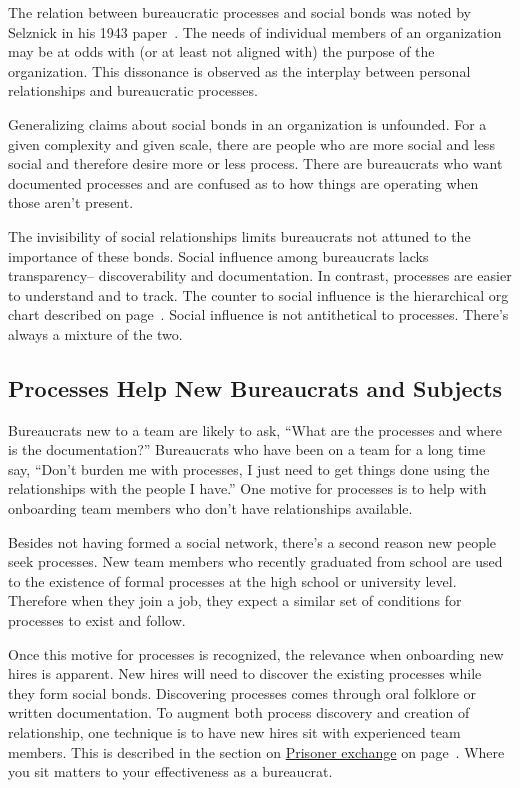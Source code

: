 The relation between bureaucratic processes and social bonds was noted by Selznick in his 1943 paper~\cite{1943_Selznick}. The needs of individual members of an organization may be at odds with (or at least not aligned with) the purpose of the organization. This dissonance is observed as the interplay between personal relationships and bureaucratic processes.

Generalizing claims about social bonds in an organization is unfounded. 
For a given complexity and given scale, there are people who are more social and less social and therefore desire more or less process.
There are bureaucrats who want documented processes and are confused as to how things are operating when those aren't present. 

The invisibility of social relationships limits bureaucrats not attuned to the importance of these bonds. 
Social influence among bureaucrats lacks transparency-- discoverability and documentation. 
In contrast, processes are easier to understand and to track. The counter to social influence is the hierarchical \gls{org chart} described on 
page~\pageref{sec:org-chart-as-guide-and-lie}.
Social influence is not antithetical to processes. There's always a mixture of the two.


\subsection*{Processes Help New Bureaucrats and Subjects}

Bureaucrats new to a team are likely to ask, ``What are the processes and where is the documentation?'' Bureaucrats who have been on a team for a long time say, ``Don't burden me with processes, I just need to get things done using the relationships with the people I have.'' One motive for processes is to help with onboarding team members who don't have relationships available.

Besides not having formed a social network, there's a second reason new people seek processes. New team members who recently graduated from school are used to the existence of formal processes at the high school or university level. Therefore when they join a job, they expect a similar set of conditions for processes to exist and follow.

Once this motive for processes is recognized, the relevance when onboarding new hires is apparent. New hires will need to discover the existing processes while they form social bonds. Discovering processes comes through oral folklore or written documentation. To augment both process discovery and creation of relationship, one technique is to have new hires sit with experienced team members.
This is described in the section on  
\hyperref[sec:prisoner-exchange]{Prisoner exchange} on 
page~\pageref{sec:prisoner-exchange}.
Where you sit matters to your effectiveness as a bureaucrat.

